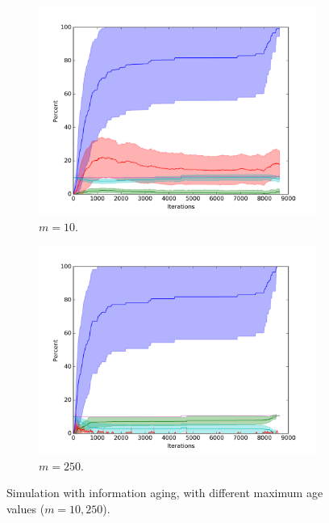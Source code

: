 \begin{figure}
\centering

\begin{subfigure}{0.6\textwidth}
\includegraphics[width=\linewidth]{images/plots/extra_malicious/1_10}
\caption{$m = 10$.} \label{fig:extra10}
\end{subfigure}

\begin{subfigure}{0.6\textwidth}
\includegraphics[width=\linewidth]{images/plots/extra_malicious/1_250}
\caption{$m = 250$.} \label{fig:extra250}
\end{subfigure}

\caption{Simulation with information aging, with different maximum age values ($m=10, 250$).}
\label{fig:extramaliciousaging1}
\end{figure}

